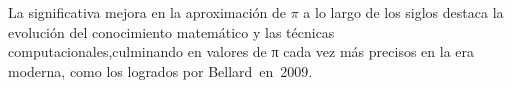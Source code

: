 \documentclass[preview]{standalone}
\begin{document}
\begin{center}
La significativa mejora en la aproximación de $\pi$ a lo largo de los siglos destaca la evolución del conocimiento matemático y las técnicas computacionales,\n culminando en valores de π cada vez más precisos en la era moderna, como los logrados por Bellard en 2009.
\end{center}
\end{document}
